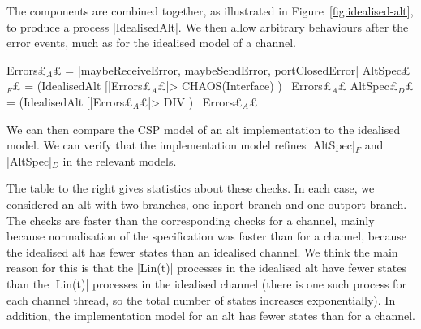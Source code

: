 
The components are combined together, as illustrated in
Figure~\ref{fig:idealised-alt}, to produce a process |IdealisedAlt|.  We
then allow arbitrary behaviours after the error events, much as for the
idealised model of a channel.
%
\begin{cspm}
Errors£$_A$£ = {|maybeReceiveError, maybeSendError, portClosedError|}
AltSpec£$_F$£ = (IdealisedAlt [|Errors£$_A$£|> CHAOS(Interface) ) \ Errors£$_A$£
AltSpec£$_D$£ = (IdealisedAlt [|Errors£$_A$£|> DIV ) \ Errors£$_A$£
\end{cspm}

We can then compare the CSP model of an alt implementation to the idealised
model.  We can verify that the implementation model refines |AltSpec|$_F$ and
|AltSpec|$_D$ in the relevant models.

\begin{window}
%
The table to the right gives statistics about these checks.  In each case, we
considered an alt with two branches, one inport branch and one outport
branch.  The checks are faster than the corresponding checks for a channel,
mainly because normalisation of the specification was
faster than for a channel, because the idealised alt has fewer states than an
idealised channel.  We think the main reason for this is that the |Lin(t)|
processes in the idealised alt have fewer states than the |Lin(t)| processes
in the idealised channel (there is one such process for each channel thread,
so the total number of states increases exponentially).  In addition, the
implementation model for an alt has fewer states than for a channel.
\end{window}

